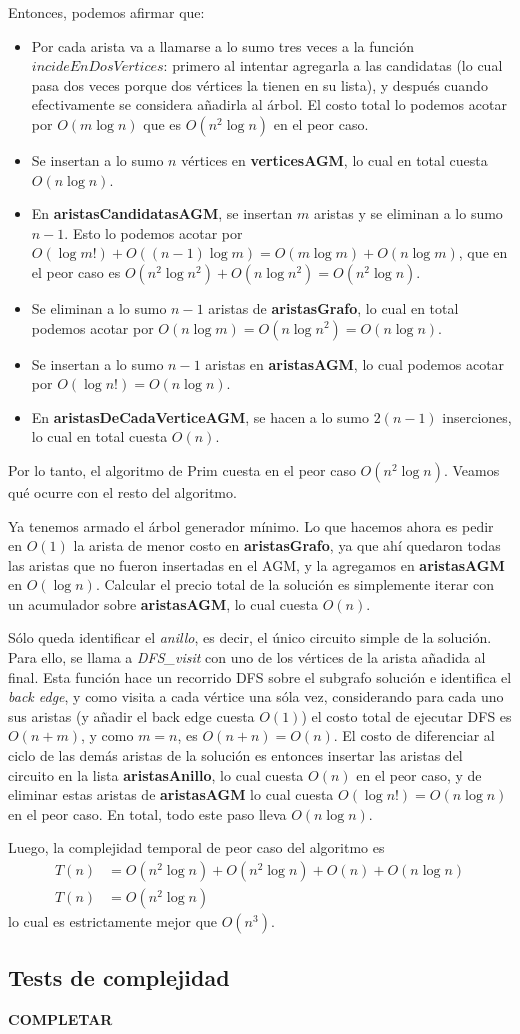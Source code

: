 \noindent Entonces, podemos afirmar que:
\begin{itemize}
\item Por cada arista va a llamarse a lo sumo tres veces a la función $incideEnDosVertices$: primero al intentar agregarla a las candidatas (lo cual pasa dos veces porque dos vértices la tienen en su lista), y después cuando efectivamente se considera añadirla al árbol. El costo total lo podemos acotar por $O(m \log n)$ que es $O(n^2 \log n)$ en el peor caso.
\item Se insertan a lo sumo $n$ vértices en \textbf{verticesAGM}, lo cual en total cuesta $O(n \log n)$.
\item En \textbf{aristasCandidatasAGM}, se insertan $m$ aristas y se eliminan a lo sumo $n-1$. Esto lo podemos acotar por $O(\log m!) + O((n-1)\log m) = O(m \log m) + O(n \log m)$, que en el peor caso es $O(n^2 \log n^2) + O(n \log n^2) = O(n^2 \log n)$.
\item Se eliminan a lo sumo $n - 1$ aristas de \textbf{aristasGrafo}, lo cual en total podemos acotar por $O(n \log m) = O(n \log n^2) = O(n \log n)$.
\item Se insertan a lo sumo $n - 1$ aristas en \textbf{aristasAGM}, lo cual podemos acotar por $O(\log n!) = O(n \log n)$.
\item En \textbf{aristasDeCadaVerticeAGM}, se hacen a lo sumo $2(n-1)$ inserciones, lo cual en total cuesta $O(n)$.
\end{itemize}
Por lo tanto, el algoritmo de Prim cuesta en el peor caso $O(n^2 \log n)$. Veamos qué ocurre con el resto del algoritmo.

Ya tenemos armado el árbol generador mínimo. Lo que hacemos ahora es pedir en $O(1)$ la arista de menor costo en \textbf{aristasGrafo}, ya que ahí quedaron todas las aristas que no fueron insertadas en el AGM, y la agregamos en \textbf{aristasAGM} en $O(\log n)$. Calcular el precio total de la solución es simplemente iterar con un acumulador sobre \textbf{aristasAGM}, lo cual cuesta $O(n)$.

Sólo queda identificar el \emph{anillo}, es decir, el único circuito simple de la solución. Para ello, se llama a \emph{DFS\_visit} con uno de los vértices de la arista añadida al final. Esta función hace un recorrido DFS sobre el subgrafo solución e identifica el \emph{back edge}, y como visita a cada vértice una sóla vez, considerando para cada uno sus aristas (y añadir el back edge cuesta $O(1)$) el costo total de ejecutar DFS es $O(n + m)$\cite[p.~606]{cormen}, y como $m = n$, es $O(n + n) = O(n)$. El costo de diferenciar al ciclo de las demás aristas de la solución es entonces insertar las aristas del circuito en la lista \textbf{aristasAnillo}, lo cual cuesta $O(n)$ en el peor caso, y de eliminar estas aristas de \textbf{aristasAGM} lo cual cuesta $O(\log n!) = O(n \log n)$ en el peor caso. En total, todo este paso lleva $O(n \log n)$.

Luego, la complejidad temporal de peor caso del algoritmo es 
\begin{align*}
T(n) &= O(n^2 \log n) + O(n^2 \log n) + O(n) + O(n \log n) \\
T(n) &= O(n^2 \log n)
\end{align*}
lo cual es estrictamente mejor que $O(n^3)$.

\subsection{Tests de complejidad}

\textbf{COMPLETAR}
